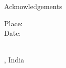 \begin{preface}{Acknowledgements}
\lipsum[2-5]


\vspace{1in}
\noindent
\begin{minipage}[t]{0.3\textwidth}
\baselineskip=18pt
Place: \\
Date: 
\end{minipage}
\begin{minipage}[t]{0.65\textwidth}
\begin{flushright}
\baselineskip=18pt
    {\bf  \studentname}\\
    \institute,  India\\
\end{flushright}
\end{minipage}

\end{preface} %